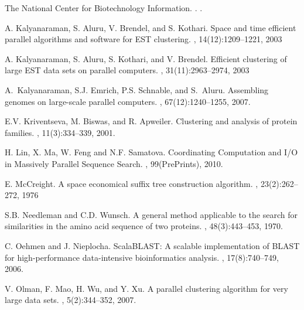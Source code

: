 \documentclass[10pt,journal,letterpaper,compsoc]{IEEEtran}
\begin{document}
\begin{thebibliography}{1}
The National Center for Biotechnology Information. 
. 
.

A. Kalyanaraman, S. Aluru, V. Brendel, and S. Kothari. 
\newblock Space and time efficient parallel algorithms and software for EST clustering. 
, 14(12):1209--1221, 2003

 A. Kalyanaraman, S. Aluru, S. Kothari, and V. Brendel. 
 \newblock Efficient clustering of large EST data sets on parallel computers. 
 , 31(11):2963--2974, 2003

A.~Kalyanaraman, S.J. Emrich, P.S. Schnable, and S.~Aluru.
\newblock Assembling genomes on large-scale parallel computers.
,
  67(12):1240--1255, 2007.

E.V. Kriventseva, M. Biswas, and R. Apweiler.
\newblock Clustering and analysis of protein families.
, 11(3):334--339, 2001.

H. Lin, X. Ma, W. Feng and N.F. Samatova.
\newblock Coordinating Computation and I/O in Massively Parallel Sequence Search.
, 99(PrePrints), 2010.


E. McCreight.
\newblock A space economical suffix tree construction algorithm.
, 23(2):262--272, 1976

S.B. Needleman and C.D. Wunsch.
\newblock A general method applicable to the search for similarities in the amino acid sequence of two proteins.
, 48(3):443--453, 1970.


C. Oehmen and J. Nieplocha.
\newblock ScalaBLAST: A scalable implementation of BLAST for high-performance data-intensive bioinformatics analysis.
, 17(8):740--749, 2006.


V. Olman, F. Mao, H. Wu, and Y. Xu.
\newblock A parallel clustering algorithm for very large data sets.
, 5(2):344--352, 2007.



\end{thebibliography}
\end{document}

